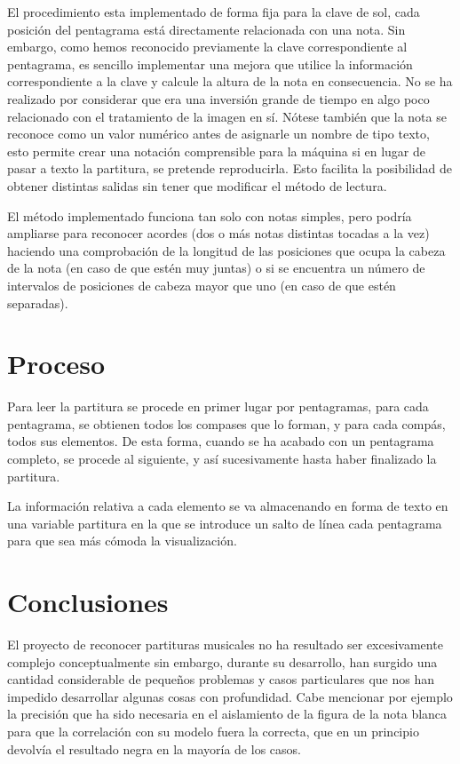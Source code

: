 \documentclass[10pt, a4paper]{article}
\begin{document}
El procedimiento esta implementado de forma fija para la clave de sol, cada posición del pentagrama está directamente relacionada con una nota. Sin embargo, como hemos reconocido previamente la clave correspondiente al pentagrama, es sencillo implementar una mejora que utilice la información correspondiente a la clave y calcule la altura de la nota en consecuencia. No se ha realizado por considerar que era una inversión grande de tiempo en algo poco relacionado con el tratamiento de la imagen en sí. Nótese también que la nota se reconoce como un valor numérico antes de asignarle un nombre de tipo texto, esto permite crear una notación comprensible para la máquina si en lugar de pasar a texto la partitura, se pretende reproducirla. Esto facilita la posibilidad de obtener distintas salidas sin tener que modificar el método de lectura.

El método implementado funciona tan solo con notas simples, pero podría ampliarse para reconocer acordes (dos o más notas distintas tocadas a la vez) haciendo una comprobación de la longitud de las posiciones que ocupa la cabeza de la nota (en caso de que estén muy juntas) o si se encuentra un número de intervalos de posiciones de cabeza mayor que uno (en caso de que estén separadas).

\section{Proceso}

Para leer la partitura se procede en primer lugar por pentagramas, para cada pentagrama, se obtienen todos los compases que lo forman, y para cada compás, todos sus elementos. De esta forma, cuando se ha acabado con un pentagrama completo, se procede al siguiente, y así sucesivamente hasta haber finalizado la partitura. 

La información relativa a cada elemento se va almacenando en forma de texto en una variable partitura en la que se introduce un salto de línea cada pentagrama para que sea más cómoda la visualización.

\section{Conclusiones}

El proyecto de reconocer partituras musicales no ha resultado ser excesivamente complejo conceptualmente sin embargo, durante su desarrollo, han surgido una cantidad considerable de pequeños problemas y casos particulares que nos han impedido desarrollar algunas cosas con profundidad. Cabe mencionar por ejemplo la precisión que ha sido necesaria en el aislamiento de la figura de la nota blanca para que la correlación con su modelo fuera la correcta, que en un principio devolvía el resultado negra en la mayoría de los casos.
\end{document}
